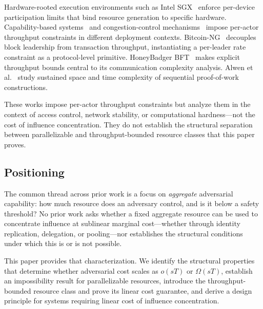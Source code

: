 \documentclass[10pt,journal,compsoc]{IEEEtran}
\theoremstyle{remark}
\begin{document}
	Hardware-rooted execution environments such as
	Intel SGX~\cite{costan2016intel} enforce per-device
	participation limits that bind resource generation
	to specific hardware.
	Capability-based systems~\cite{levy1984capability}
	and congestion-control mechanisms~\cite{jacobson1988congestion}
	impose per-actor throughput constraints in different
	deployment contexts.
	Bitcoin-NG~\cite{eyal2018bitcoinng} decouples block
	leadership from transaction throughput, instantiating
	a per-leader rate constraint as a protocol-level primitive.
	HoneyBadger BFT~\cite{miller2016honeybadger} makes
	explicit throughput bounds central to its communication
	complexity analysis.
	Alwen et al.~\cite{alwen2019blockchain} study
	sustained space and time complexity of sequential
	proof-of-work constructions.
	
	These works impose per-actor throughput constraints
	but analyze them in the context of access control,
	network stability, or computational hardness---not
	the cost of influence concentration.
	They do not establish the structural separation between
	parallelizable and throughput-bounded resource classes
	that this paper proves.
	
	\subsection{Positioning}
	\label{ssec:rw_positioning}
	
	The common thread across prior work is a focus on
	\emph{aggregate} adversarial capability: how much
	resource does an adversary control, and is it below
	a safety threshold?
	No prior work asks whether a fixed aggregate resource
	can be used to concentrate influence at sublinear
	marginal cost---whether through identity replication,
	delegation, or pooling---nor establishes the structural
	conditions under which this is or is not possible.
	
	This paper provides that characterization.
	We identify the structural properties that determine
	whether adversarial cost scales as $o(sT)$ or
	$\Omega(sT)$, establish an impossibility result for
	parallelizable resources, introduce the throughput-bounded
	resource class and prove its linear cost guarantee,
	and derive a design principle for systems requiring
	linear cost of influence concentration.
	
\end{document}
